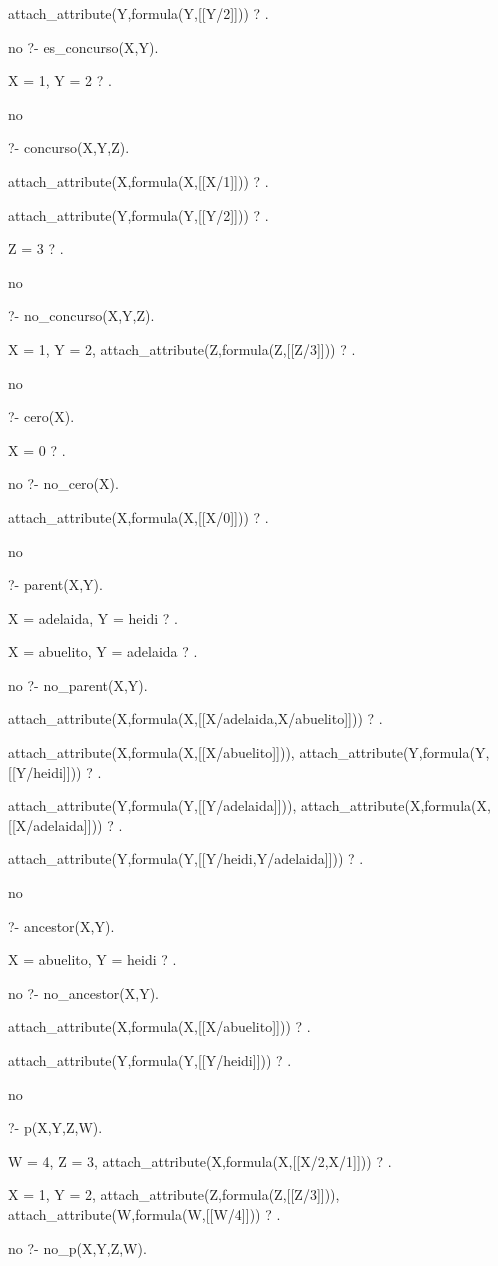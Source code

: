 attach_attribute(Y,formula(Y,[[Y/2]])) ? .

no
?- es_concurso(X,Y).

X = 1,
Y = 2 ? .

no

?- concurso(X,Y,Z).

attach_attribute(X,formula(X,[[X/1]])) ? .

attach_attribute(Y,formula(Y,[[Y/2]])) ? .

Z = 3 ? .

no

?- no_concurso(X,Y,Z).

X = 1,
Y = 2,
attach_attribute(Z,formula(Z,[[Z/3]])) ? .

no

?- cero(X).

X = 0 ? .

no
?- no_cero(X).

attach_attribute(X,formula(X,[[X/0]])) ? .

no

?- parent(X,Y).

X = adelaida,
Y = heidi ? .

X = abuelito,
Y = adelaida ? .

no
?- no_parent(X,Y).

attach_attribute(X,formula(X,[[X/adelaida,X/abuelito]])) ? .

attach_attribute(X,formula(X,[[X/abuelito]])),
attach_attribute(Y,formula(Y,[[Y/heidi]])) ? .

attach_attribute(Y,formula(Y,[[Y/adelaida]])),
attach_attribute(X,formula(X,[[X/adelaida]])) ? .

attach_attribute(Y,formula(Y,[[Y/heidi,Y/adelaida]])) ? .

no

?- ancestor(X,Y).

X = abuelito,
Y = heidi ? .

no
?- no_ancestor(X,Y).

attach_attribute(X,formula(X,[[X/abuelito]])) ? .

attach_attribute(Y,formula(Y,[[Y/heidi]])) ? .

no

?- p(X,Y,Z,W).

W = 4,
Z = 3,
attach_attribute(X,formula(X,[[X/2,X/1]])) ? .

X = 1,
Y = 2,
attach_attribute(Z,formula(Z,[[Z/3]])),
attach_attribute(W,formula(W,[[W/4]])) ? .

no
?- no_p(X,Y,Z,W).

